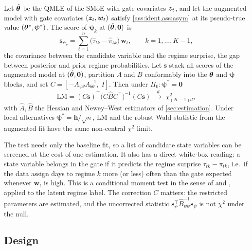 \begin{proposition}\label{prop:lm-gate}
Let $\hat{\bm{\theta}}$ be the QMLE of the SMoE with gate covariates $\bm{z}_t$, and let the augmented model
with gate covariates $(\bm{z}_t,\bm w_t)$ satisfy \cref{ass:ident,ass:asym} at its pseudo-true value
$(\bm{\theta}^\ast,\bm\psi^\ast)$. The score of $\bm\psi_k$ at $(\hat{\bm{\theta}},\bm0)$ is
\begin{equation}\label{eq:lm-score}
  \bm s_{\psi_k}=\sum_{t=1}^n\big(\hat\tau_{tk}-\hat\pi_{tk}\big)\,\bm w_t,\qquad k=1,\dots,K-1,
\end{equation}
the covariance between the candidate variable and the regime surprise, the gap between posterior
and prior regime probabilities. Let $\bm s$ stack all scores of the augmented model at
$(\hat{\bm{\theta}},\bm0)$, partition $A$ and $B$ conformably into the $\bm{\theta}$ and $\bm\psi$ blocks, and set
$C=[-A_{\psi\theta}A_{\theta\theta}^{-1},\;I]$. Then under $H_0:\bm\psi^\ast=\bm0$
\begin{equation}\label{eq:lm}
  \mathrm{LM}=(C\bm s)^\top\big(C\hat BC^\top\big)^{-1}(C\bm s)\;\xrightarrow{d}\;\chi^2_{(K-1)d},
\end{equation}
with $\hat A,\hat B$ the Hessian and Newey--West estimators of \cref{sec:estimation}. Under local
alternatives $\bm\psi^\ast=\bm h/\sqrt n$, $\mathrm{LM}$ and the robust Wald statistic from the
augmented fit have the same non-central $\chi^2$ limit.
\end{proposition}

\noindent The test needs only the baseline fit, so a list of candidate state variables can be
screened at the cost of one estimation. It also has a direct white-box reading: a state variable
belongs in the gate if it predicts the regime surprise $\tau_{tk}-\pi_{tk}$, i.e.\ if the data assign
days to regime $k$ more (or less) often than the gate expected whenever $\bm w_t$ is high. This is a
conditional moment test in the sense of \citet{newey1985maximum} and \citet{tauchen1985diagnostic},
applied to the latent regime label. The correction $C$ matters: the restricted parameters are
estimated, and the uncorrected statistic $\bm s_\psi^\top\hat B_{\psi\psi}^{-1}\bm s_\psi$ is not
$\chi^2$ under the null.

\subsection{Design}

